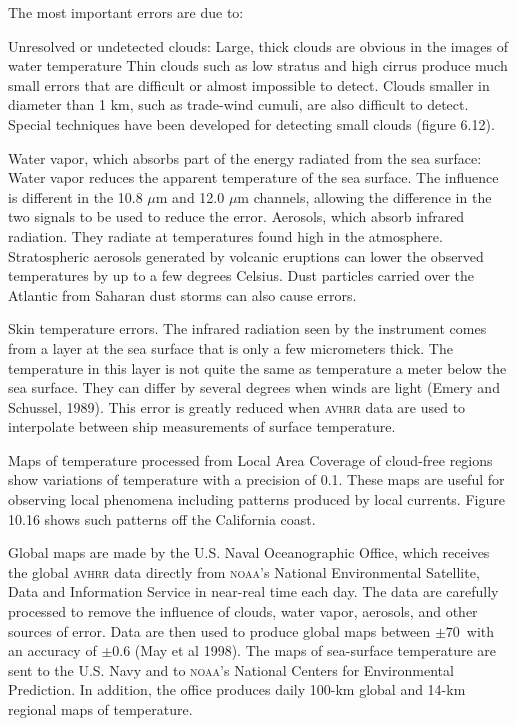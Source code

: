The most important errors are due to:
\begin{enumerate}
\vitem Unresolved or undetected clouds: Large, thick clouds are
obvious in the images of water temperature Thin clouds such as low
stratus and high cirrus produce much small errors that are
difficult or almost impossible to detect. Clouds smaller in
diameter than 1 km, such as trade-wind cumuli, are also difficult
to detect. Special techniques have been developed for detecting
small clouds (figure 6.12). 

\vitem Water vapor, which absorbs part
of the energy radiated from the sea surface: Water vapor reduces
the apparent temperature of the sea surface. The influence is
different in the 10.8 $\mu$m and 12.0 $\mu$m channels, allowing
the difference in the two signals to be used to reduce the error.
\vitem Aerosols, which absorb infrared radiation. They radiate at
temperatures found high in the atmosphere. Stratospheric aerosols
generated by volcanic eruptions can lower the observed
temperatures by up to a few degrees Celsius. Dust particles
carried over the Atlantic from Saharan dust storms can also cause
errors.

\vitem Skin temperature errors. The infrared radiation seen by the instrument
comes from a layer at the sea surface that is only a few
micrometers thick. The temperature in this layer is not quite the same
as temperature a meter below the sea surface. They can differ by
several degrees when winds are light (Emery and Schussel,
1989). This error is greatly
reduced when \textsc{avhrr} data are
used to interpolate between ship measurements of surface temperature.
\end{enumerate}

Maps of temperature processed from Local Area Coverage of cloud-free regions
show variations of temperature with a precision of 0.1. These maps
are useful for observing local phenomena including patterns produced by local
currents. Figure 10.16 shows such patterns off the California coast.

Global maps are made by the U.S. Naval Oceanographic Office, which receives the global \textsc{avhrr} data directly from \textsc{noaa}'s National Environmental Satellite, Data and Information Service in near-real time each day. The data are carefully processed to remove the influence of clouds, water vapor, aerosols, and other sources of error. Data are then used to produce global maps between $\pm 70$\degrees\ with an accuracy of $\pm 0.6$ (May et al 1998). The maps of sea-surface temperature are sent to the U.S. Navy and to \textsc{noaa}'s National Centers for Environmental Prediction. In addition, the office produces daily 100-km global and 14-km regional maps of temperature.

